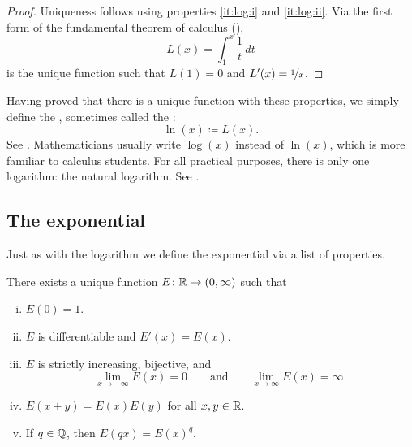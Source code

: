 \begin{proof}
Uniqueness follows using properties \ref{it:log:i} and
\ref{it:log:ii}.  Via the first form of the
fundamental theorem of calculus (),
\begin{equation*}
L(x) = \int_1^x \frac{1}{t}\,dt
\end{equation*}
is the unique function such that $L(1) = 0$ and $L'(x) = \nicefrac{1}{x}$.
\end{proof}

Having proved
that there is a unique function with these properties,
we simply define the \emph{}, sometimes called the
\emph{}:
\begin{equation*}
\ln(x) \coloneqq L(x) .
\end{equation*}
See .
Mathematicians usually write $\log(x)$ instead of $\ln(x)$, which is
more familiar to calculus students.  For all practical purposes, there is only one logarithm:
the natural logarithm.  See .
\begin{myfigureht}
\caption{Plot of $\ln(x)$ together with $\nicefrac{1}{x}$, showing the value
$\ln(4)$.\label{fig:log}}
\end{myfigureht}

\subsection{The exponential}

Just as with the logarithm we define the exponential via a list of
properties.

\begin{prop}
There exists a unique function $E \colon {\mathbb{R}} \to (0,\infty)$ such that
\begin{enumerate}[(i)]
\item \label{it:exp:i}
$E(0) = 1$.
\item \label{it:exp:ii}
$E$ is differentiable and $E'(x) = E(x)$.
\item \label{it:exp:iii}
$E$ is strictly increasing, bijective, and
\begin{equation*}
\lim_{x\to -\infty} E(x) = 0 \qquad \text{and} \qquad
\lim_{x\to \infty} E(x) = \infty .
\end{equation*}
\item \label{it:exp:iv}
$E(x+y) = E(x)E(y)$ for all $x,y \in {\mathbb{R}}$.
\item \label{it:exp:v}
If $q \in {\mathbb{Q}}$, then
$E(qx) = {E(x)}^q$.
\end{enumerate}
\end{prop}

